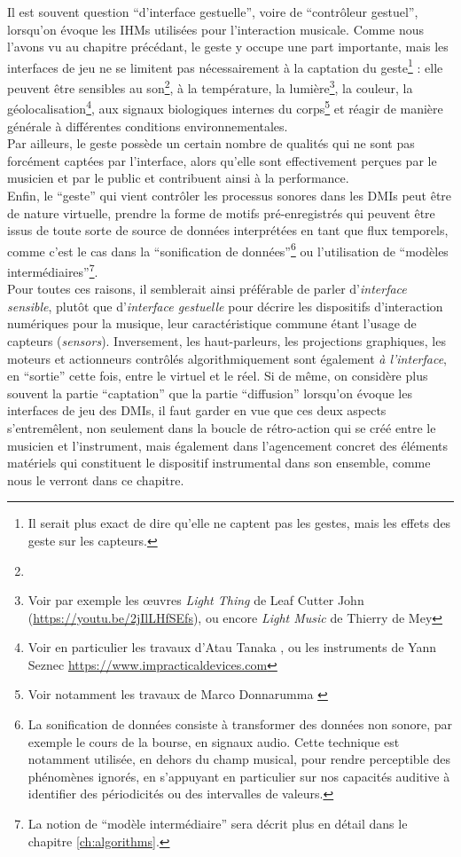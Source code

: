 \noindent Il est souvent question ``d'interface gestuelle'', voire de ``contrôleur gestuel'', lorsqu'on évoque les \glspl{IHM} utilisées pour l'interaction musicale. Comme nous l'avons vu au chapitre précédant, le geste y occupe une part importante, mais les interfaces de jeu ne se limitent pas nécessairement à la captation du geste\footnote{Il serait plus exact de dire qu'elle ne captent pas les gestes, mais les effets des geste sur les capteurs.} : elle peuvent être sensibles au son\footnote{}, à la température, la lumière\footnote{Voir par exemple les œuvres \textit{Light Thing} de Leaf Cutter John (\url{https://youtu.be/2jIlLHfSEfs}), ou encore \textit{Light Music} de Thierry de Mey}, la couleur, la géolocalisation\footnote{Voir en particulier les travaux d'Atau Tanaka \cite{tanaka_mobile_2004}, ou les instruments de Yann Seznec \url{https://www.impracticaldevices.com}}, aux signaux biologiques internes du corps\footnote{Voir notamment les travaux de Marco Donnarumma \cite{donnarumma_biophysical_2017}} et réagir de manière générale à différentes conditions environnementales.\\
\indent Par ailleurs, le geste possède un certain nombre de qualités qui ne sont pas forcément captées par l'interface, alors qu'elle sont effectivement perçues par le musicien et par le public et contribuent ainsi à la performance.\\
\indent Enfin, le ``geste'' qui vient contrôler les processus sonores dans les \glspl{DMI} peut être de nature virtuelle, prendre la forme de motifs pré-enregistrés qui peuvent être issus de toute sorte de source de données interprétées en tant que flux temporels, comme c'est le cas dans la ``sonification de données''\footnote{La sonification de données consiste à transformer des données non sonore, par exemple le cours de la bourse, en signaux audio. Cette technique est notamment utilisée, en dehors du champ musical, pour rendre perceptible des phénomènes ignorés, en s'appuyant en particulier sur nos capacités auditive à identifier des périodicités ou des intervalles de valeurs.} ou l'utilisation de ``modèles intermédiaires''\footnote{La notion de ``modèle intermédiaire'' sera décrit plus en détail dans le chapitre \ref{ch:algorithms}.}.\\
\indent Pour toutes ces raisons, il semblerait ainsi préférable de parler d'\textit{interface sensible}, plutôt que d'\textit{interface gestuelle} pour décrire les dispositifs d'interaction numériques pour la musique, leur caractéristique commune étant l'usage de capteurs (\textit{sensors}).
\indent Inversement, les haut-parleurs, les projections graphiques, les moteurs et actionneurs contrôlés algorithmiquement sont également \textit{à l'interface}, en ``sortie'' cette fois, entre le virtuel et le réel. Si de même, on considère plus souvent la partie ``captation'' que la partie ``diffusion'' lorsqu'on évoque les interfaces de jeu des \glspl{DMI}, il faut garder en vue que ces deux aspects s'entremêlent, non seulement dans la boucle de rétro-action qui se créé entre le musicien et l'instrument, mais également dans l'agencement concret des éléments matériels qui constituent le dispositif instrumental dans son ensemble, comme nous le verront dans ce chapitre.\\
